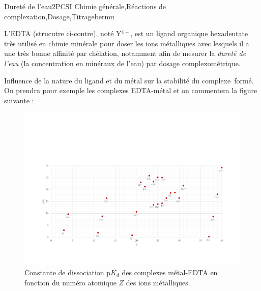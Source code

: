 
\begin{exercise}{Dureté de l'eau}{2}{PCSI}
{Chimie générale,Réactions de complexation,Dosage,Titrage}{bermu}

\noindent\begin{minipage}{\linewidth}
\begin{figure}
\end{figure}

\quad L'EDTA (strucutre ci-contre), noté Y$^{4-}$, est un ligand organique hexadentate très utilisé en chimie minérale pour doser les ions métalliques avec lesquels il a une très bonne affinité par chélation, notamment afin de mesurer la \emph{dureté de l'eau} (la concentration en minéraux de l'eau) par dosage complexométrique.
\end{minipage}

\begin{questions}
\questioncours Influence de la nature du ligand et du métal sur la stabilité du complexe~formé. \\
On prendra pour exemple les complexes EDTA-métal et on commentera la figure suivante : \vspace{-1em}

\begin{EnvUplevel}
    \begin{figure}[H]
        \centering
        \includegraphics[width=\linewidth]{chimiePC/gene/EDTA.pdf}
        \caption{Constante de dissociation p$K_d$ des complexes métal-EDTA en fonction du numéro atomique $Z$ des ions métalliques.}
    \end{figure}
\end{EnvUplevel}


\end{questions}
\end{exercise}
